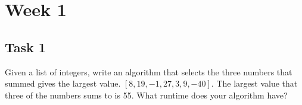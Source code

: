 \documentclass{article}
\begin{document}
   \section{Week 1} 
   \subsection{Task 1}

Given a list of integers, write an algorithm that selects the three numbers that summed gives the largest value. 
\( [8, 19, -1, 27, 3, 9, -40] \). The largest value that three of the numbers sums to is 55. What runtime does your algorithm have?
\end{document}
